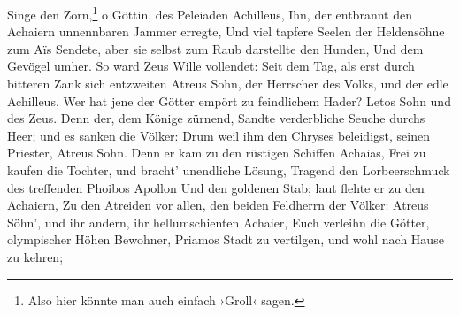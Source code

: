 \begin{pairs}
\begin{Rightside}
\beginnumbering
{}
\pstart
Singe den Zorn,\footnote{Also hier könnte man auch einfach ›Groll‹ sagen.} o Göttin, des Peleiaden Achilleus, 
Ihn, der entbrannt den Achaiern unnennbaren Jammer erregte,
Und viel tapfere Seelen der Heldensöhne zum Aïs
Sendete, aber sie selbst zum Raub darstellte den Hunden,
Und dem Gevögel umher. So ward Zeus Wille vollendet:
Seit dem Tag, als erst durch bitteren Zank sich entzweiten
Atreus Sohn, der Herrscher des Volks, und der edle Achilleus.
\pend
\pstart
Wer hat jene der Götter empört zu feindlichem Hader?
Letos Sohn und des Zeus. Denn der, dem Könige zürnend,
Sandte verderbliche Seuche durchs Heer; und es sanken die Völker:
Drum weil ihm den Chryses beleidigst, seinen Priester,
Atreus Sohn.
\pend
\pstart
Denn er kam zu den rüstigen Schiffen Achaias,
Frei zu kaufen die Tochter, und bracht' unendliche Lösung,
Tragend den Lorbeerschmuck des treffenden Phoibos Apollon
Und den goldenen Stab; laut flehte er zu den Achaiern,
Zu den Atreiden vor allen, den beiden Feldherrn der Völker: 
Atreus Söhn', und ihr andern, ihr hellumschienten Achaier,
Euch verleihn die Götter, olympischer Höhen Bewohner,
Priamos Stadt zu vertilgen, und wohl nach Hause zu kehren;
\pend
\endnumbering

\end{Rightside}
\end{pairs}

\Columns






